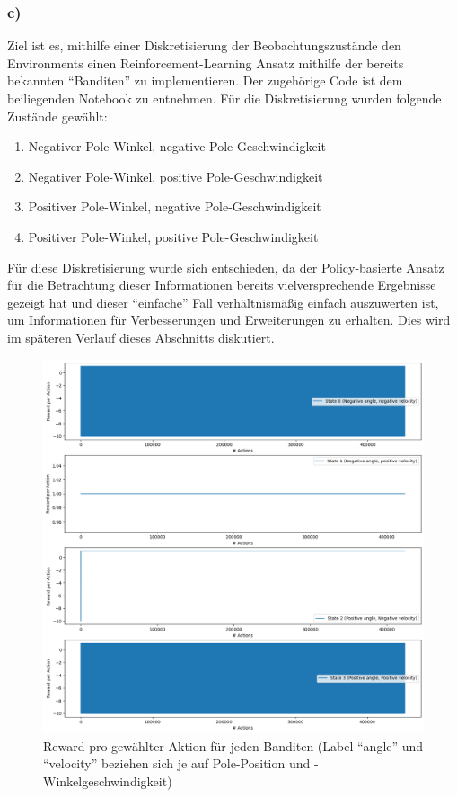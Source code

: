 \documentclass[11pt]{article}
\begin{document}
\subsubsection*{c)}
Ziel ist es, mithilfe einer Diskretisierung der Beobachtungszustände den Environments einen Reinforcement-Learning Ansatz mithilfe der bereits bekannten ``Banditen'' zu implementieren. Der zugehörige Code ist dem beiliegenden Notebook zu entnehmen.
Für die Diskretisierung wurden folgende Zustände gewählt:
\begin{enumerate}
    \item Negativer Pole-Winkel, negative Pole-Geschwindigkeit 
    \item Negativer Pole-Winkel, positive Pole-Geschwindigkeit 
    \item Positiver Pole-Winkel, negative Pole-Geschwindigkeit 
    \item Positiver Pole-Winkel, positive Pole-Geschwindigkeit 
\end{enumerate}
Für diese Diskretisierung wurde sich entschieden, da der Policy-basierte Ansatz für die Betrachtung dieser Informationen bereits vielversprechende Ergebnisse gezeigt hat und dieser ``einfache'' Fall verhältnismäßig einfach auszuwerten ist, um Informationen für Verbesserungen und Erweiterungen zu erhalten. Dies wird im späteren Verlauf dieses Abschnitts diskutiert.\\
\begin{figure}
    \centering
    \includegraphics[width=\textwidth]{img/img_2_3_c1.png}
    \caption{Reward pro gewählter Aktion für jeden Banditen (Label ``angle'' und ``velocity'' beziehen sich je auf Pole-Position und -Winkelgeschwindigkeit)
    \label{img:2_3_c1}}
\end{figure}
\end{document}
